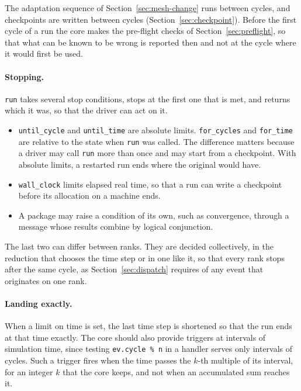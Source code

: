 \documentclass[11pt,a4paper]{article}
\newcommand{\code}[1]{\texttt{#1}}
\begin{document}
The adaptation sequence of Section~\ref{sec:mesh-change} runs between
cycles, and checkpoints are written between cycles
(Section~\ref{sec:checkpoint}).  Before the first cycle of a run the core makes the pre-flight
checks of Section~\ref{sec:preflight}, so that what can be known to be wrong
is reported then and not at the cycle where it would first be used.

\paragraph{Stopping.}  \code{run} takes several stop conditions, stops at
the first one that is met, and returns which it was, so that the driver can
act on it.

\begin{itemize}
  \item \code{until\_cycle} and \code{until\_time} are absolute limits.
        \code{for\_cycles} and \code{for\_time} are relative to the state
        when \code{run} was called.  The difference matters because a driver
        may call \code{run} more than once and may start from a checkpoint.
        With absolute limits, a restarted run ends where the original would
        have.
  \item \code{wall\_clock} limits elapsed real time, so that a run can write
        a checkpoint before its allocation on a machine ends.
  \item A package may raise a condition of its own, such as convergence,
        through a message whose results combine by logical conjunction.
\end{itemize}

The last two can differ between ranks.  They are decided collectively, in
the reduction that chooses the time step or in one like it, so that every
rank stops after the same cycle, as Section~\ref{sec:dispatch} requires of
any event that originates on one rank.

\paragraph{Landing exactly.}  When a limit on time is set, the last time
step is shortened so that the run ends at that time exactly.  The core
should also provide triggers at intervals of simulation time, since testing
\code{ev.cycle \% n} in a handler serves only intervals of cycles.  Such a
trigger fires when the time passes the $k$-th multiple of its interval, for
an integer $k$ that the core keeps, and not when an accumulated sum reaches
it.
\end{document}

